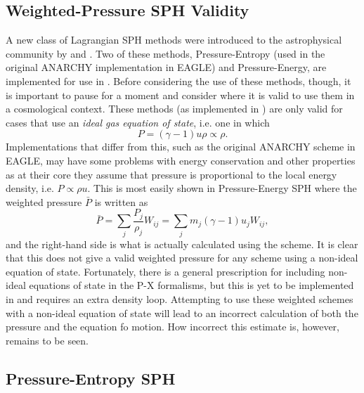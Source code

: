 \subsection{Weighted-Pressure SPH Validity}

A new class of Lagrangian SPH methods were introduced to the astrophysical community
by \citet{Hopkins2013} and \citet{Saitoh2013}. Two of these methods, Pressure-Entropy
(used in the original ANARCHY implementation in EAGLE) and Pressure-Energy, are
implemented for use in \swift{}. Before considering the use of these methods, though,
it is important to pause for a moment and consider where it is valid to use them
in a cosmological context. These methods (as implemented in \swift{}) are only valid
for cases that use an \emph{ideal gas equation of state}, i.e. one in which
\begin{equation}
  P = (\gamma - 1) u \rho \propto \rho.
  \nonumber
\end{equation}
Implementations that differ from this, such as the original ANARCHY scheme in EAGLE,
may have some problems with energy conservation \cite[see][]{Hosono2013} and other
properties as at their core they assume that pressure is proportional to the local
energy density, i.e. $P \propto \rho u$. This is most easily shown in Pressure-Energy
SPH where the weighted pressure $\bar{P}$ is written as
\begin{equation}
  \bar{P} = \sum_j \frac{P_j}{\rho_j} W_{ij} = \sum_j m_j (\gamma - 1) u_j W_{ij},
\end{equation}
and the right-hand side is what is actually calculated using the scheme. It is 
clear that this does not give a valid weighted pressure for any scheme using a non-ideal
equation of state. Fortunately, there is a general prescription for including non-ideal
equations of state in the P-X formalisms, but this is yet to be implemented in \swift{}
and requires an extra density loop. Attempting to use these weighted schemes with
a non-ideal equation of state will lead to an incorrect calculation of both the pressure
and the equation fo motion. How incorrect this estimate is, however, remains to be seen.


\subsection{Pressure-Entropy SPH}
\label{sec:sph:pe}

